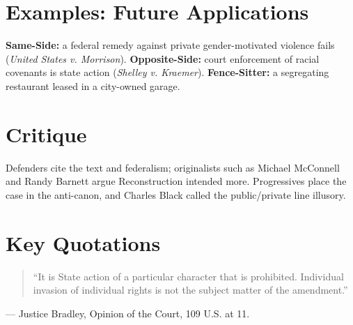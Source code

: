 \documentclass[12pt]{article}
\begin{document}
\section{Examples: Future Applications}
\textbf{Same-Side:} a federal remedy against private gender-motivated violence fails (\textit{United States v. Morrison}). \textbf{Opposite-Side:} court enforcement of racial covenants is state action (\textit{Shelley v. Kraemer}). \textbf{Fence-Sitter:} a segregating restaurant leased in a city-owned garage.

\section{Critique}
Defenders cite the text and federalism; originalists such as Michael McConnell and Randy Barnett argue Reconstruction intended more. Progressives place the case in the anti-canon, and Charles Black called the public/private line illusory.

\section{Key Quotations}
\begin{quote}
``It is State action of a particular character that is prohibited. Individual invasion of individual rights is not the subject matter of the amendment.''
\end{quote}
\noindent --- Justice Bradley, Opinion of the Court, 109 U.S. at 11.
\end{document}

